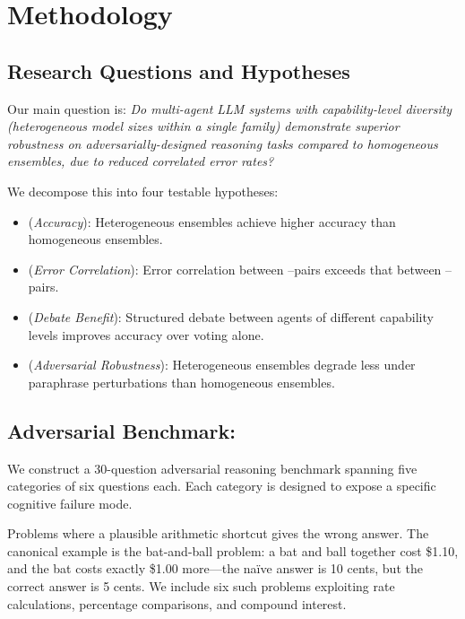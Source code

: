 \section{Methodology}
\label{sec:method}

\subsection{Research Questions and Hypotheses}

Our main question is: \emph{Do multi-agent LLM systems with capability-level diversity
(heterogeneous model sizes within a single family) demonstrate superior robustness
on adversarially-designed reasoning tasks compared to homogeneous ensembles,
due to reduced correlated error rates?}

We decompose this into four testable hypotheses:

\begin{itemize}[leftmargin=*,itemsep=2pt,topsep=2pt]
    \item \Hone (\emph{Accuracy}): Heterogeneous ensembles achieve higher accuracy
          than homogeneous ensembles.
    \item \Htwo (\emph{Error Correlation}): Error correlation between
          \haiku--\haiku pairs exceeds that between \haiku--\sonnet pairs.
    \item \Hthree (\emph{Debate Benefit}): Structured debate between agents of
          different capability levels improves accuracy over voting alone.
    \item \Hfour (\emph{Adversarial Robustness}): Heterogeneous ensembles degrade
          less under paraphrase perturbations than homogeneous ensembles.
\end{itemize}

\subsection{Adversarial Benchmark: \advbench}

We construct a 30-question adversarial reasoning benchmark
spanning five categories of six questions each.
Each category is designed to expose a specific cognitive failure mode.

Problems where a plausible arithmetic shortcut gives the wrong answer.
The canonical example is the bat-and-ball problem: a bat and ball together cost
\$1.10, and the bat costs exactly \$1.00 more---the na\"ive answer is 10 cents,
but the correct answer is 5 cents. We include six such problems exploiting
rate calculations, percentage comparisons, and compound interest.


